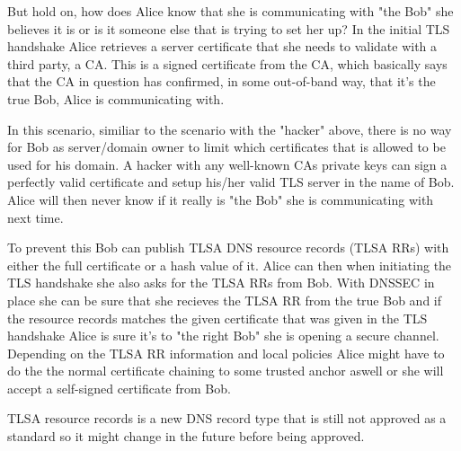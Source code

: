 But hold on, how does Alice know that she is communicating with "the Bob" she believes it is or is it someone else that is trying to set her up?
In the initial TLS handshake Alice retrieves a server certificate that she needs to validate with a third party, a CA.
This is a signed certificate from the CA, which basically says that the CA in question has confirmed, in some out-of-band way, that it's the true Bob, Alice is communicating with.

In this scenario, similiar to the scenario with the "hacker" above, there is no way for Bob as server/domain owner to limit which certificates that is allowed to be used for his domain.
A hacker with any well-known CAs private keys can sign a perfectly valid certificate and setup his/her valid TLS server in the name of Bob.
Alice will then never know if it really is "the Bob" she is communicating with next time.

To prevent this Bob can publish TLSA DNS resource records (TLSA RRs)\cite[ch. 2]{rfc:draft-dane} with either the full certificate or a hash value of it.
Alice can then when initiating the TLS handshake she also asks for the TLSA RRs from Bob.
With DNSSEC in place she can be sure that she recieves the TLSA RR from the true Bob and if the resource records matches the given certificate that was given in the TLS handshake Alice is sure it's to "the right Bob" she is opening a secure channel.
Depending on the TLSA RR information and local policies Alice might have to do the the normal certificate chaining to some trusted anchor aswell or she will accept a self-signed certificate from Bob.


TLSA resource records is a new DNS record type that is still not approved as a standard so it might change in the future before being approved.

